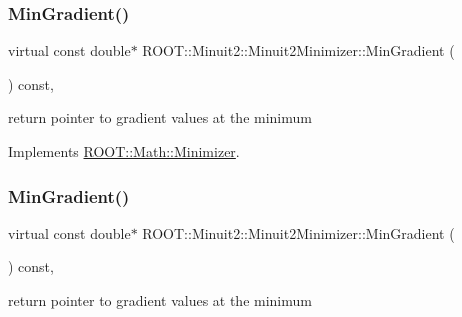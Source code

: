 \mbox{\label{classROOT_1_1Minuit2_1_1Minuit2Minimizer_a52c6b3a13108b64366b1acd43f7e2b9a}} 
\subsubsection{\texorpdfstring{MinGradient()}{MinGradient()}\hspace{0.1cm}{\footnotesize\ttfamily [2/3]}}
{\footnotesize\ttfamily virtual const double$\ast$ R\+O\+O\+T\+::\+Minuit2\+::\+Minuit2\+Minimizer\+::\+Min\+Gradient (\begin{DoxyParamCaption}{ }\end{DoxyParamCaption}) const\hspace{0.3cm}{\ttfamily [inline]}, {\ttfamily [virtual]}}



return pointer to gradient values at the minimum 



Implements \mbox{\hyperlink{classROOT_1_1Math_1_1Minimizer_a861036d38a21d9a60d44e068397307af}{R\+O\+O\+T\+::\+Math\+::\+Minimizer}}.

\mbox{\label{classROOT_1_1Minuit2_1_1Minuit2Minimizer_a52c6b3a13108b64366b1acd43f7e2b9a}} 
\subsubsection{\texorpdfstring{MinGradient()}{MinGradient()}\hspace{0.1cm}{\footnotesize\ttfamily [3/3]}}
{\footnotesize\ttfamily virtual const double$\ast$ R\+O\+O\+T\+::\+Minuit2\+::\+Minuit2\+Minimizer\+::\+Min\+Gradient (\begin{DoxyParamCaption}{ }\end{DoxyParamCaption}) const\hspace{0.3cm}{\ttfamily [inline]}, {\ttfamily [virtual]}}



return pointer to gradient values at the minimum 




